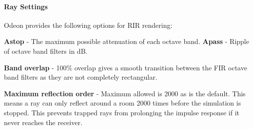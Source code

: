 \documentclass[../../main.tex]{subfiles}
\begin{document}
			\paragraph{Ray Settings}

				Odeon provides the following options for \ac{RIR} rendering:


				\textbf{Astop} - The maximum possible attenuation of each octave band.
				\textbf{Apass} - Ripple of octave band filters in dB.

				\textbf{Band overlap} - 100\% overlap gives a smooth transition between the FIR octave band filters as they are not completely rectangular.

				\textbf{Maximum reflection order} - Maximum allowed is 2000 as is the default. This means a ray can only reflect around a room 2000 times before the simulation is stopped. This prevents trapped rays from prolonging the impulse response if it never reaches the receiver.
\end{document}
